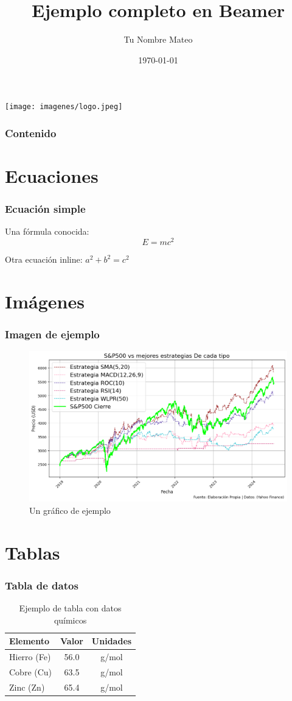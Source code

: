 \documentclass{beamer}
\title{Ejemplo completo en Beamer}
\author{Tu Nombre Mateo}
\institute{Tu Institución Udp}
\date{\today}
\begin{document}
\begin{frame}
  \titlepage
  \centering \texttt{[image: imagenes/logo.jpeg]}
  \end{frame}

\begin{frame}
  \frametitle{Contenido}
  \tableofcontents
\end{frame}

\section{Ecuaciones}

\begin{frame}
  \frametitle{Ecuación simple}
  Una fórmula conocida:
  \[
    E = mc^2
  \]

  Otra ecuación inline: \( a^2 + b^2 = c^2 \)
\end{frame}

\section{Imágenes}

\begin{frame}
  \frametitle{Imagen de ejemplo}
  \begin{figure}
    \centering
    \includegraphics[width=0.8\linewidth]{imagenes/grafico1.png}
    \caption{Un gráfico de ejemplo}
  \end{figure}
\end{frame}

\section{Tablas}

\begin{frame}
  \frametitle{Tabla de datos}
  \begin{table}
    \centering
    \begin{tabular}{lcc}
      \toprule
      Elemento & Valor & Unidades \\
      \midrule
      Hierro (Fe) & 56.0 & g/mol \\
      Cobre (Cu) & 63.5 & g/mol \\
      Zinc (Zn) & 65.4 & g/mol \\
      \bottomrule
    \end{tabular}
    \caption{Ejemplo de tabla con datos químicos}
  \end{table}
\end{frame}
\end{document}
